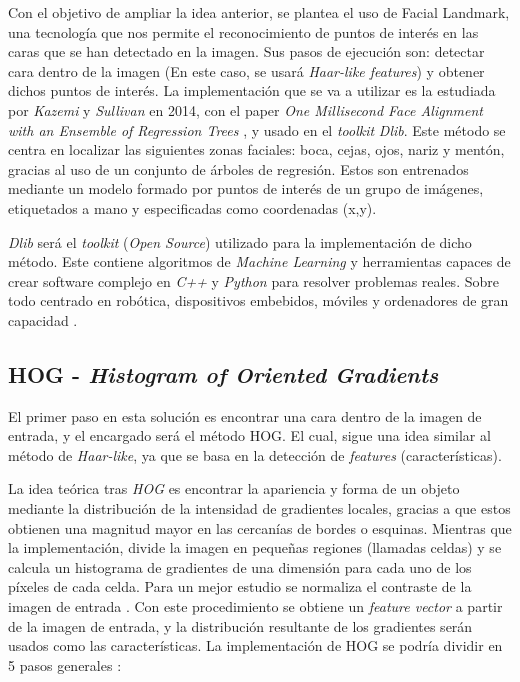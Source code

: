 Con el objetivo de ampliar la idea anterior, se plantea el uso de Facial Landmark, una tecnología que nos permite el reconocimiento de puntos de interés en las caras que se han detectado en la imagen. Sus pasos de ejecución son: detectar cara dentro de la imagen (En este caso, se usará \textit{Haar-like features}) y obtener dichos puntos de interés. La implementación que se va a utilizar es la estudiada por \textit{Kazemi} y \textit{Sullivan} en 2014, con el paper \textit{One Millisecond Face Alignment with an Ensemble of Regression Trees} \cite{inproceedings}, y usado en el \textit{toolkit} \textit{Dlib}. Este método se centra en localizar las siguientes zonas faciales: boca, cejas, ojos, nariz y mentón, gracias al uso de un conjunto de árboles de regresión. Estos son entrenados mediante  un modelo formado por puntos de interés de un grupo de imágenes, etiquetados a mano y especificadas como coordenadas (x,y). 

\textit{Dlib} será el \textit{toolkit} (\textit{Open Source}) utilizado para la implementación de dicho método. Este contiene algoritmos de \textit{Machine Learning} y herramientas capaces de crear software complejo en \textit{C++} y \textit{Python} para resolver problemas reales. Sobre todo centrado en robótica, dispositivos embebidos, móviles y ordenadores de gran capacidad \cite{dlib}. 

\subsection*{HOG - \textit{Histogram of Oriented Gradients}}

El primer paso en esta solución es encontrar una cara dentro de la imagen de entrada, y el encargado será el método HOG. El cual, sigue una idea similar al método de \textit{Haar-like}, ya que se basa en la detección de \textit{features} (características).

La idea teórica tras \textit{HOG} es encontrar la apariencia y forma de un objeto mediante la distribución de la intensidad de gradientes locales, gracias a que estos obtienen una magnitud mayor en las cercanías de bordes o esquinas. Mientras que la implementación, divide la imagen en pequeñas regiones (llamadas celdas) y se calcula un histograma de gradientes de una dimensión para cada uno de los píxeles de cada celda. Para un mejor estudio se normaliza el contraste de la imagen de entrada \cite{hog}. Con este procedimiento se obtiene un \textit{feature vector} a partir de la imagen de entrada, y la distribución resultante de los gradientes serán usados como las características. La implementación de HOG se podría dividir en 5 pasos generales \cite{hog2}:

